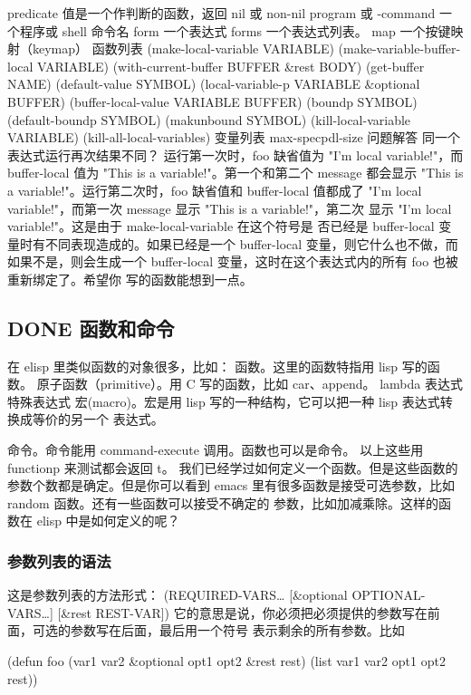\documentclass[11pt]{ctexart}
\begin{document}
\begin{SCR}
predicate 值是一个作判断的函数，返回 nil 或 non-nil
program 或 -command 一个程序或 shell 命令名
form 一个表达式
forms 一个表达式列表。
map 一个按键映射（keymap）
函数列表
(make-local-variable VARIABLE)
(make-variable-buffer-local VARIABLE)
(with-current-buffer BUFFER \&rest BODY)
(get-buffer NAME)
(default-value SYMBOL)
(local-variable-p VARIABLE \&optional BUFFER)
(buffer-local-value VARIABLE BUFFER)
(boundp SYMBOL)
(default-boundp SYMBOL)
(makunbound SYMBOL)
(kill-local-variable VARIABLE)
(kill-all-local-variables)
变量列表
max-specpdl-size
问题解答
同一个表达式运行再次结果不同？
运行第一次时，foo 缺省值为 "I'm local variable!"，而 buffer-local 值为 "This is a variable!"。第一个和第二个 message 都会显示 "This is a variable!"。运行第二次时，foo 缺省值和 buffer-local 值都成了 "I'm local variable!"，而第一次 message 显示 "This is a variable!"，第二次 显示 "I'm local variable!"。这是由于 make-local-variable 在这个符号是 否已经是 buffer-local 变量时有不同表现造成的。如果已经是一个 buffer-local 变量，则它什么也不做，而如果不是，则会生成一个 buffer-local 变量，这时在这个表达式内的所有 foo 也被重新绑定了。希望你 写的函数能想到一点。
\end{SCR}
\subsection{{\bfseries\sffamily DONE} 函数和命令}
\label{sec:orge0fd629}
在 elisp 里类似函数的对象很多，比如：
函数。这里的函数特指用 lisp 写的函数。
原子函数（primitive）。用 C 写的函数，比如 car、append。
lambda 表达式
特殊表达式
宏(macro)。宏是用 lisp 写的一种结构，它可以把一种 lisp 表达式转换成等价的另一个
表达式。

命令。命令能用 command-execute 调用。函数也可以是命令。
以上这些用 functionp 来测试都会返回 t。
我们已经学过如何定义一个函数。但是这些函数的参数个数都是确定。但是你可以看到
emacs 里有很多函数是接受可选参数，比如 random 函数。还有一些函数可以接受不确定的
参数，比如加减乘除。这样的函数在 elisp 中是如何定义的呢？

\subsubsection{参数列表的语法}
\label{sec:org7ad3995}

这是参数列表的方法形式：
(REQUIRED-VARS\ldots{}
[\&optional OPTIONAL-VARS\ldots{}]
[\&rest REST-VAR])
它的意思是说，你必须把必须提供的参数写在前面，可选的参数写在后面，最后用一个符号
表示剩余的所有参数。比如

(defun foo (var1 var2 \&optional opt1 opt2 \&rest rest)
(list var1 var2 opt1 opt2 rest))
\end{document}
